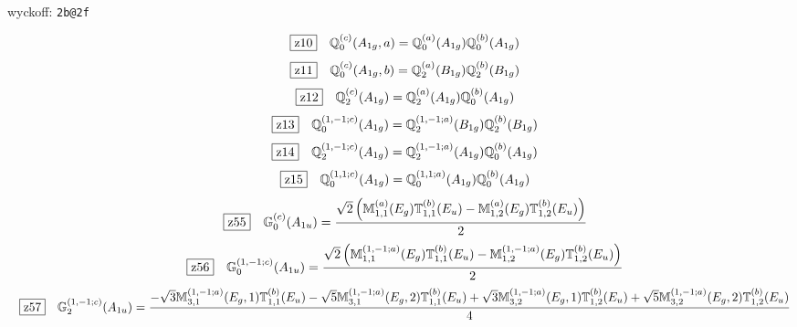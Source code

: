 \documentclass[fleqn,10pt,landscape]{jsarticle}
\begin{document}
\noindent\quad * wyckoff: \texttt{2b@2f}

\begin{dmath*}
\hspace*{3mm}\fbox{z10}\quad \mathbb{Q}_{0}^{(c)}(A_{1g},a)=\mathbb{Q}_{0}^{(a)}(A_{1g}) \mathbb{Q}_{0}^{(b)}(A_{1g})
\end{dmath*}
\begin{dmath*}
\hspace*{3mm}\fbox{z11}\quad \mathbb{Q}_{0}^{(c)}(A_{1g},b)=\mathbb{Q}_{2}^{(a)}(B_{1g}) \mathbb{Q}_{2}^{(b)}(B_{1g})
\end{dmath*}
\begin{dmath*}
\hspace*{3mm}\fbox{z12}\quad \mathbb{Q}_{2}^{(c)}(A_{1g})=\mathbb{Q}_{2}^{(a)}(A_{1g}) \mathbb{Q}_{0}^{(b)}(A_{1g})
\end{dmath*}
\begin{dmath*}
\hspace*{3mm}\fbox{z13}\quad \mathbb{Q}_{0}^{(1,-1;c)}(A_{1g})=\mathbb{Q}_{2}^{(1,-1;a)}(B_{1g}) \mathbb{Q}_{2}^{(b)}(B_{1g})
\end{dmath*}
\begin{dmath*}
\hspace*{3mm}\fbox{z14}\quad \mathbb{Q}_{2}^{(1,-1;c)}(A_{1g})=\mathbb{Q}_{2}^{(1,-1;a)}(A_{1g}) \mathbb{Q}_{0}^{(b)}(A_{1g})
\end{dmath*}
\begin{dmath*}
\hspace*{3mm}\fbox{z15}\quad \mathbb{Q}_{0}^{(1,1;c)}(A_{1g})=\mathbb{Q}_{0}^{(1,1;a)}(A_{1g}) \mathbb{Q}_{0}^{(b)}(A_{1g})
\end{dmath*}
\begin{dmath*}
\hspace*{3mm}\fbox{z55}\quad \mathbb{G}_{0}^{(c)}(A_{1u})=\frac{\sqrt{2} \left(\mathbb{M}_{1,1}^{(a)}(E_{g}) \mathbb{T}_{1,1}^{(b)}(E_{u}) - \mathbb{M}_{1,2}^{(a)}(E_{g}) \mathbb{T}_{1,2}^{(b)}(E_{u})\right)}{2}
\end{dmath*}
\begin{dmath*}
\hspace*{3mm}\fbox{z56}\quad \mathbb{G}_{0}^{(1,-1;c)}(A_{1u})=\frac{\sqrt{2} \left(\mathbb{M}_{1,1}^{(1,-1;a)}(E_{g}) \mathbb{T}_{1,1}^{(b)}(E_{u}) - \mathbb{M}_{1,2}^{(1,-1;a)}(E_{g}) \mathbb{T}_{1,2}^{(b)}(E_{u})\right)}{2}
\end{dmath*}
\begin{dmath*}
\hspace*{3mm}\fbox{z57}\quad \mathbb{G}_{2}^{(1,-1;c)}(A_{1u})=\frac{- \sqrt{3} \mathbb{M}_{3,1}^{(1,-1;a)}(E_{g},1) \mathbb{T}_{1,1}^{(b)}(E_{u}) - \sqrt{5} \mathbb{M}_{3,1}^{(1,-1;a)}(E_{g},2) \mathbb{T}_{1,1}^{(b)}(E_{u}) + \sqrt{3} \mathbb{M}_{3,2}^{(1,-1;a)}(E_{g},1) \mathbb{T}_{1,2}^{(b)}(E_{u}) + \sqrt{5} \mathbb{M}_{3,2}^{(1,-1;a)}(E_{g},2) \mathbb{T}_{1,2}^{(b)}(E_{u})}{4}
\end{dmath*}
\end{document}
